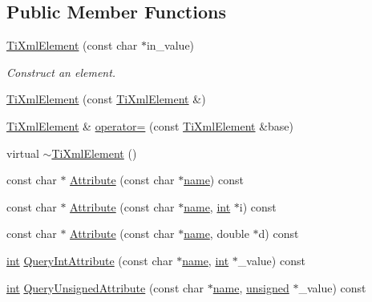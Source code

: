 \subsection*{Public Member Functions}
\begin{DoxyCompactItemize}
\item 
\hyperlink{class_ti_xml_element_a01bc3ab372d35da08efcbbe65ad90c60}{Ti\-Xml\-Element} (const char $\ast$in\-\_\-value)
\begin{DoxyCompactList}\small\item\em Construct an element. \end{DoxyCompactList}\item 
\hyperlink{class_ti_xml_element_a1ca4465f3c2eac6a60e641cd7f1d9f7e}{Ti\-Xml\-Element} (const \hyperlink{class_ti_xml_element}{Ti\-Xml\-Element} \&)
\item 
\hyperlink{class_ti_xml_element}{Ti\-Xml\-Element} \& \hyperlink{class_ti_xml_element_adecf0300374e8658629996b3ee12cf18}{operator=} (const \hyperlink{class_ti_xml_element}{Ti\-Xml\-Element} \&base)
\item 
virtual \hyperlink{class_ti_xml_element_a1efd5c5bda1cafe6e1cc94255ff6f582}{$\sim$\-Ti\-Xml\-Element} ()
\item 
const char $\ast$ \hyperlink{class_ti_xml_element_ae419a442a9701a62b0c3d8fd1cbdd12d}{Attribute} (const char $\ast$\hyperlink{fmod__codec_8h_a5c4947d4516dd7cfa3505ce3a648a4ef}{name}) const 
\item 
const char $\ast$ \hyperlink{class_ti_xml_element_a0ed8348fdc56b72a6b4900ce5bac1849}{Attribute} (const char $\ast$\hyperlink{fmod__codec_8h_a5c4947d4516dd7cfa3505ce3a648a4ef}{name}, \hyperlink{wglew_8h_a500a82aecba06f4550f6849b8099ca21}{int} $\ast$i) const 
\item 
const char $\ast$ \hyperlink{class_ti_xml_element_aeaff99d4f0ea5b34f7aee202aad457ba}{Attribute} (const char $\ast$\hyperlink{fmod__codec_8h_a5c4947d4516dd7cfa3505ce3a648a4ef}{name}, double $\ast$d) const 
\item 
\hyperlink{wglew_8h_a500a82aecba06f4550f6849b8099ca21}{int} \hyperlink{class_ti_xml_element_aea0bfe471380f281c5945770ddbf52b9}{Query\-Int\-Attribute} (const char $\ast$\hyperlink{fmod__codec_8h_a5c4947d4516dd7cfa3505ce3a648a4ef}{name}, \hyperlink{wglew_8h_a500a82aecba06f4550f6849b8099ca21}{int} $\ast$\-\_\-value) const 
\item 
\hyperlink{wglew_8h_a500a82aecba06f4550f6849b8099ca21}{int} \hyperlink{class_ti_xml_element_ae48df644f890ab86fa19839ac401f00d}{Query\-Unsigned\-Attribute} (const char $\ast$\hyperlink{fmod__codec_8h_a5c4947d4516dd7cfa3505ce3a648a4ef}{name}, \hyperlink{_free_image_8h_a425076c7067a1b5166e2cc530e914814}{unsigned} $\ast$\-\_\-value) const 

\end{DoxyCompactItemize}
